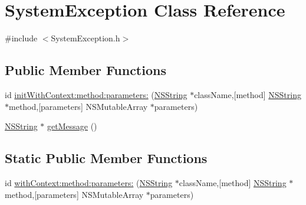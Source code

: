 \hypertarget{interface_system_exception}{
\section{\-System\-Exception \-Class \-Reference}
\label{interface_system_exception}
}


{\ttfamily \#include $<$\-System\-Exception.\-h$>$}

\subsection*{\-Public \-Member \-Functions}
\begin{DoxyCompactItemize}
\item 
id \hyperlink{interface_system_exception_a89e9a2347ac5ed2b8c48b7dac9fa1975}{init\-With\-Context\-:method\-:parameters\-:} (\hyperlink{class_n_s_string}{\-N\-S\-String} $\ast$class\-Name,\mbox{[}method\mbox{]} \hyperlink{class_n_s_string}{\-N\-S\-String} $\ast$method,\mbox{[}parameters\mbox{]} \-N\-S\-Mutable\-Array $\ast$parameters)
\item 
\hyperlink{class_n_s_string}{\-N\-S\-String} $\ast$ \hyperlink{interface_system_exception_a5502e14d754e79050e3b3cfe7c17555e}{get\-Message} ()
\end{DoxyCompactItemize}
\subsection*{\-Static \-Public \-Member \-Functions}
\begin{DoxyCompactItemize}
\item 
id \hyperlink{interface_system_exception_a58f05bab866c80fe68ec6b65a4b8a364}{with\-Context\-:method\-:parameters\-:} (\hyperlink{class_n_s_string}{\-N\-S\-String} $\ast$class\-Name,\mbox{[}method\mbox{]} \hyperlink{class_n_s_string}{\-N\-S\-String} $\ast$method,\mbox{[}parameters\mbox{]} \-N\-S\-Mutable\-Array $\ast$parameters)
\end{DoxyCompactItemize}



